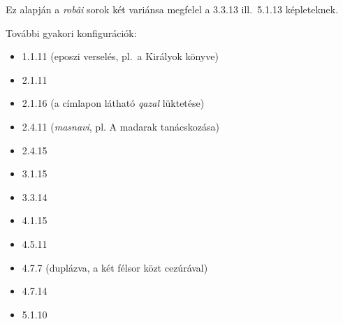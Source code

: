 Ez alapján a \emph{robâi} sorok két variánsa megfelel a 3{.}3{.}13
ill.~5{.}1{.}13 képleteknek.

További gyakori konfigurációk:
\begin{itemize}
  \item 1{.}1{.}11 (eposzi verselés, pl.~a Királyok könyve)
  \item 2{.}1{.}11
  \item 2{.}1{.}16 (a címlapon látható \emph{qazal} lüktetése)
  \item 2{.}4{.}11 (\emph{masnavi}, pl. A madarak tanácskozása)
  \item 2{.}4{.}15
  \item 3{.}1{.}15
  \item 3{.}3{.}14
  \item 4{.}1{.}15
  \item 4{.}5{.}11
  \item 4{.}7{.}7 (duplázva, a két félsor közt cezúrával)
  \item 4{.}7{.}14
  \item 5{.}1{.}10
\end{itemize}
